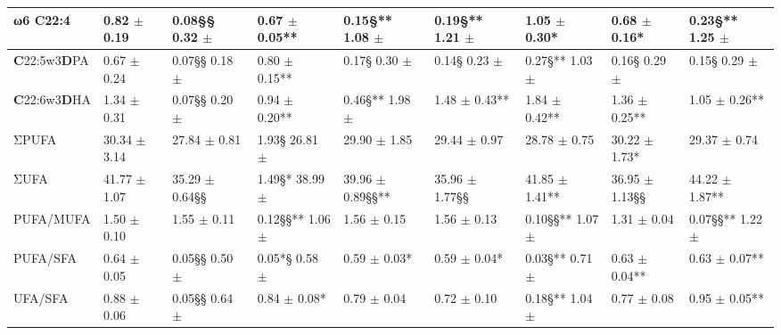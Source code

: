 \documentclass[11pt]{article}
\begin{document}
\begin{table}
{\begin{tabular}{|l|l|l|l|l|l|l|l|l|}
\hline
ω6 \textbf{C}22:4 & 0.82 $\pm$ 0.19 & 0.08§§ 0.32 $\pm$ & 0.67 $\pm$ 0.05** & 0.15§** 1.08 $\pm$ & 0.19§** 1.21 $\pm$ & 1.05 $\pm$ 0.30* & 0.68 $\pm$ 0.16* & 0.23§** 1.25 $\pm$ \\
\hline
\textbf{C}22:5w3\textbf{D}PA & 0.67 $\pm$ 0.24 & 0.07§§ 0.18 $\pm$ & 0.80 $\pm$ 0.15** & 0.17§ 0.30 $\pm$ & 0.14§ 0.23 $\pm$ & 0.27§** 1.03 $\pm$ & 0.16§ 0.29 $\pm$ & 0.15§ 0.29 $\pm$ \\
\hline
\textbf{C}22:6w3\textbf{D}HA & 1.34 $\pm$ 0.31 & 0.07§§ 0.20 $\pm$ & 0.94 $\pm$ 0.20** & 0.46§** 1.98 $\pm$ & 1.48 $\pm$ 0.43** & 1.84 $\pm$ 0.42** & 1.36 $\pm$ 0.25** & 1.05 $\pm$ 0.26** \\
\hline
ΣPUFA & 30.34 $\pm$ 3.14 & 27.84 $\pm$ 0.81 & 1.93§ 26.81 $\pm$ & 29.90 $\pm$ 1.85 & 29.44 $\pm$ 0.97 & 28.78 $\pm$ 0.75 & 30.22 $\pm$ 1.73* & 29.37 $\pm$ 0.74 \\
\hline
ΣUFA & 41.77 $\pm$ 1.07 & 35.29 $\pm$ 0.64§§ & 1.49§* 38.99 $\pm$ & 39.96 $\pm$ 0.89§§** & 35.96 $\pm$ 1.77§§ & 41.85 $\pm$ 1.41** & 36.95 $\pm$ 1.13§§ & 44.22 $\pm$ 1.87** \\
\hline
PUFA/MUFA & 1.50 $\pm$ 0.10 & 1.55 $\pm$ 0.11 & 0.12§§** 1.06 $\pm$ & 1.56 $\pm$ 0.15 & 1.56 $\pm$ 0.13 & 0.10§§** 1.07 $\pm$ & 1.31 $\pm$ 0.04 & 0.07§§** 1.22 $\pm$ \\
\hline
PUFA/SFA & 0.64 $\pm$ 0.05 & 0.05§§ 0.50 $\pm$ & 0.05*§ 0.58 $\pm$ & 0.59 $\pm$ 0.03* & 0.59 $\pm$ 0.04* & 0.03§** 0.71 $\pm$ & 0.63 $\pm$ 0.04** & 0.63 $\pm$ 0.07** \\
\hline
UFA/SFA & 0.88 $\pm$ 0.06 & 0.05§§ 0.64 $\pm$ & 0.84 $\pm$ 0.08* & 0.79 $\pm$ 0.04 & 0.72 $\pm$ 0.10 & 0.18§** 1.04 $\pm$ & 0.77 $\pm$ 0.08 & 0.95 $\pm$ 0.05** \\
\hline
\end{tabular}
}%
\end{table}
\end{document}
